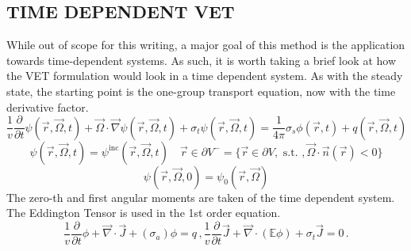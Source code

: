 \documentclass[12pt]{report}
\newcommand{\vr}{\vec{r}}
\newcommand{\vO}{\vec{\Omega}}
\renewcommand{\div}{\vec{\nabla} \cdot}
\newcommand{\grad}{\vec{\nabla}}
\newcommand{\Edd}{\mathbb{E}}
\newcommand{\sigt}{\sigma_t}
\newcommand{\sigs}{\sigma_s}
\newcommand{\siga}{\sigma_a}
\newcommand{\scalSource}{q}
\begin{document}
\newpage
\begin{appendices}
\renewcommand{\appendixname}{APPENDIX}

\chapter{ \uppercase{Time Dependent VET} } \label{chap:appx1}
While out of scope for this writing, a major goal of this method is the application towards time-dependent systems. As such, it is worth taking a brief look at how the VET formulation would look in a time dependent system. As with the steady state, the starting point is the one-group transport equation, now with the time derivative factor.
\begin{equation}
\label{Trans1GTE}
\frac{1}{v} \frac{\partial}{\partial t} \psi(\vr,\vO,t)+ \vO \cdot \grad \psi(\vr,\vO,t) + \sigt \psi(\vr,\vO,t) = \frac{1}{4 \pi} \sigs \phi(\vr,t) + q(\vr,\vO,t)
\end{equation}
\begin{equation}
\label{Trans1GTE_bc}
\psi(\vr,\vO,t) = \psi^{\text{inc}}(\vr,\vO,t) \quad \vr \in \partial V^{-} = \{ \vr \in \partial V, \text{ s.t. }, \vO \cdot \vec{n}(\vr) < 0\}
\end{equation}
\begin{equation}
\label{Trans1GTE_t0}
\psi(\vr,\vO,0) = \psi_0(\vr,\vO)
\end{equation}
The zero-th and first angular moments are taken of the time dependent system. The Eddington Tensor is used in the 1st order equation.
\begin{subequations}
%
\begin{equation}
\label{0amTrans}
\frac{1}{v} \frac{\partial}{\partial t}\phi + \div \vec{J} + (\siga) \phi = \scalSource \,,
\end{equation}
%
\begin{equation}
\label{1amTrans}
\frac{1}{v} \frac{\partial}{\partial t}\vec{J}  + \div \left( \Edd \phi \right) + \sigt \vec{J} = 0 \,.
\end{equation}
%
\end{subequations}

\end{appendices}
\end{document}
